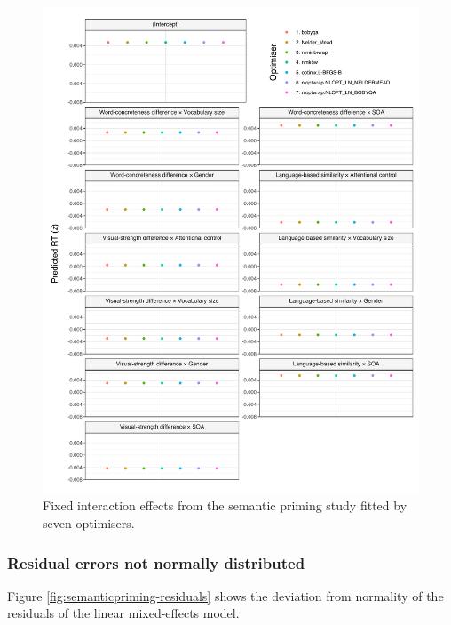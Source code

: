 \documentclass[
  12pt,
  man,floatsintext]{apa7}
\begin{document}
\begin{figure}

{\centering \includegraphics[width=1\linewidth]{../semanticpriming/frequentist_analysis/model_diagnostics/plots/interactions_semanticpriming_allFit_convergence} 

}

\caption{Fixed interaction effects from the semantic priming study fitted by seven optimisers.}\label{fig:interactions-semanticpriming-allFit-convergence}
\end{figure}

\hypertarget{residual-errors-not-normally-distributed-1}{%
\subsubsection{Residual errors not normally distributed}\label{residual-errors-not-normally-distributed-1}}

Figure \ref{fig:semanticpriming-residuals} shows the deviation from normality of the residuals of the linear mixed-effects model.
\end{document}
